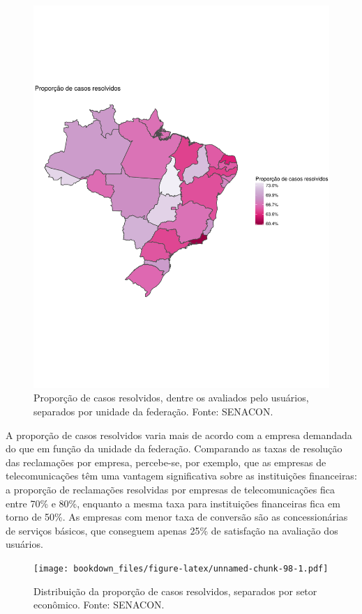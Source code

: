 \documentclass[]{report}
\begin{document}
\begin{figure}[htbp]
\centering
\includegraphics{imgs/senacon_p_uf.pdf}
\caption{Proporção de casos resolvidos, dentre os avaliados pelo
usuários, separados por unidade da federação. Fonte: SENACON.}
\end{figure}

A proporção de casos resolvidos varia mais de acordo com a empresa
demandada do que em função da unidade da federação. Comparando as taxas
de resolução das reclamações por empresa, percebe-se, por exemplo, que
as empresas de telecomunicações têm uma vantagem significativa sobre as
instituições financeiras: a proporção de reclamações resolvidas por
empresas de telecomunicações fica entre 70\% e 80\%, enquanto a mesma
taxa para instituições financeiras fica em torno de 50\%. As empresas
com menor taxa de conversão são as concessionárias de serviços básicos,
que conseguem apenas 25\% de satisfação na avaliação dos usuários.

\begin{figure}[htbp]
\centering
\texttt{[image: bookdown\_files/figure-latex/unnamed-chunk-98-1.pdf]}
\caption{\label{fig:unnamed-chunk-98}Distribuição da proporção de casos
resolvidos, separados por setor econômico. Fonte: SENACON.}
\end{figure}
\end{document}

